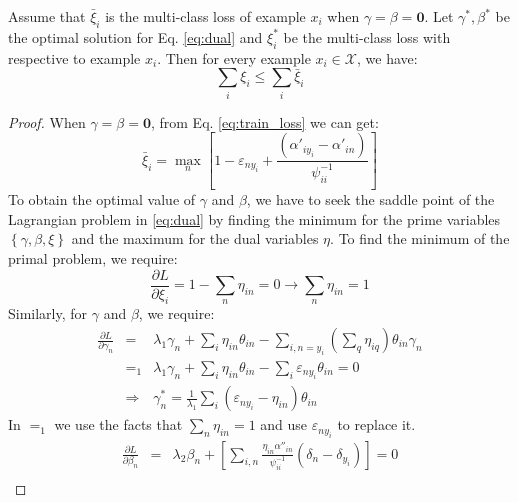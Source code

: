 \begin{theorem}\label{th:supb}
Assume that $\bar \xi_i$ is the multi-class loss of example $x_i$ when $\gamma=\beta = \mathbf{0}$. Let $\gamma^*, \beta^*$ be the optimal solution for Eq. \eqref{eq:dual} and $\xi_i^*$ be the multi-class loss with respective to example $x_i$. Then for every example $x_i \in \mathcal{X}$, we have:\[\sum\limits_i {{\xi _i}}  \le \sum\limits_i {{{\bar \xi }_i}} \]
\end{theorem}
\begin{proof}
When $\gamma=\beta = \mathbf{0}$, from Eq. \eqref{eq:train_loss} we can get:
\begin{equation*}
{\bar \xi _i} = \mathop {\max }\limits_n \left[ {1 - {\varepsilon _{n{y_i}}} + \frac{{\left( {{{\alpha '}_{i{y_i}}} - {{\alpha '}_{in}}} \right)}}{{\psi _{ii}^{ - 1}}}} \right]
\end{equation*}
To obtain the optimal value of $\gamma$ and $\beta$, we have to seek the saddle point of the Lagrangian problem in \eqref{eq:dual} by finding the minimum for the prime variables $\left\{ \gamma, \beta, \xi \right\}$ and the maximum for the dual variables $\eta $. To find the minimum of the primal problem, we require:
\begin{equation*}
\frac{{\partial L}}{{\partial {\xi _i}}} = 1 - \sum\limits_n {{\eta _{in}}}  = 0 \to \sum\limits_n {{\eta _{in}}}  = 1
\end{equation*}   
Similarly, for $\gamma$ and $\beta$, we require:
\begin{eqnarray}\label{eq:opt_gama}
\frac{{\partial L}}{{\partial {\gamma _n}}} &=& {\lambda _1}{\gamma _n} + \sum\limits_i {{\eta _{in}}{\theta _{in}}}  - \sum\limits_{i,n = {y_i}} {\left( {\sum\limits_q {{\eta _{iq}}} } \right){\theta _{in}}{\gamma _n}}  \nonumber\\
&=_1 &{\lambda _1}{\gamma _n} + \sum\limits_i {{\eta _{in}}{\theta _{in}}}  - \sum\limits_i {{\varepsilon _{n{y_i}}}{\theta _{in}}}  = 0  \nonumber\\
&\Rightarrow & \gamma _n^* = \frac{1}{{{\lambda _1}}}\sum\limits_i {\left( {{\varepsilon _{n{y_i}}} - {\eta _{in}}} \right){\theta _{in}}} 
\end{eqnarray}
In $=_1$ we use the facts that $\sum_n\eta_{in}=1$ and use $\varepsilon_{ny_i}$ to replace it.
\begin{eqnarray}\label{eq:opt_beta}
\frac{{\partial L}}{{\partial {\beta _n}}} &=& {\lambda _2}{\beta _n} + \left[ {\sum\limits_{i,n} {\frac{{{\eta _{in}}{{\alpha ''}_{in}}}}{{\psi_{ii}^{ - 1}}}\left( {{\delta _n} - {\delta _{{y_i}}}} \right)} } \right] = 0 \nonumber \\

\end{eqnarray}
\end{proof}
